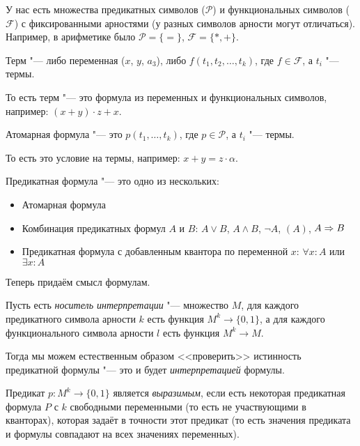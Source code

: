 У нас есть множества предикатных символов ($\mathcal P$) и функциональных символов ($\mathcal F$) с фиксированными арностями
(у разных символов арности могут отличаться).
Например, в арифметике было $\mathcal P = \{ = \}$, $\mathcal F = \{ *, + \}$.
\begin{Def}
	Терм "--- либо переменная ($x$, $y$, $a_{3}$), либо $f(t_1, t_2, \dots, t_k)$, где $f \in \mathcal F$, а $t_i$ "--- термы.

	То есть терм "--- это формула из переменных и функциональных символов, например: $(x+y) \cdot z + x$.
\end{Def}
\begin{Def}
	Атомарная формула "--- это $p(t_1, \dots, t_k)$, где $p \in \mathcal P$, а $t_i$ "--- термы.

	То есть это условие на термы, например: $x+y=z\cdot \alpha$.
\end{Def}
\begin{Def}
	Предикатная формула "--- это одно из нескольких:
	\begin{itemize}
		\item Атомарная формула
		\item Комбинация предикатных формул $A$ и $B$: $A \lor B$, $A \land B$, $\lnot A$, $(A)$, $A \Rightarrow B$
		\item Предикатная формула с добавленным квантора по переменной $x$: $\forall x \colon A$ или $\exists x \colon A$
	\end{itemize}
\end{Def}

Теперь придаём смысл формулам.
\begin{Def}
	Пусть есть \textit{носитель интерпретации} "--- множество $M$,
	для каждого предикатного символа арности $k$ есть функция $M^k \to \{ 0, 1 \}$,
	а для каждого функционального символа арности $l$ есть функция $M^k \to M$.

	Тогда мы можем естественным образом <<проверить>> истинность предикатной формулы "--- это и будет \textit{интерпретацией} формулы.
\end{Def}

\begin{Def}
	Предикат $p \colon M^k \to \{ 0, 1 \}$ является \textit{выразимым}, если есть некоторая
	предикатная формула $P$ с $k$ свободными переменными (то есть не участвующими в кванторах),
	которая задаёт в точности этот предикат (то есть значения предиката и формулы совпадают на всех значениях переменных).
\end{Def}

